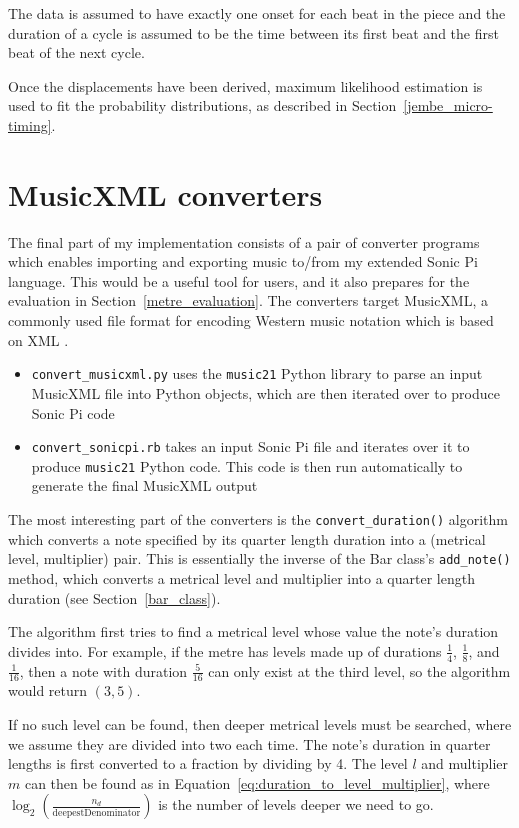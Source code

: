 \documentclass[12pt,twoside,openright]{report}
\begin{document}
The data is assumed to have exactly one onset for each beat in the piece and the
duration of a cycle is assumed to be the time between its first beat and the
first beat of the next cycle.

Once the displacements have been derived, maximum
likelihood estimation is used to fit the probability distributions, as described in
Section~\ref{jembe_micro-timing}.
\newpage



\section{MusicXML converters} \label{musicxml_converters}

The final part of my implementation consists of a pair of converter programs which enables importing and exporting music to/from my extended Sonic Pi language. This would be a useful tool for users, and it also prepares for the evaluation in Section~\ref{metre_evaluation}. The converters target MusicXML, a commonly used file format for encoding Western music notation which is based on XML \cite{good2001}.

\begin{itemize}
	\item \verb'convert_musicxml.py' uses the \verb'music21' Python library to parse an input MusicXML file into Python objects, which are then iterated over to produce Sonic Pi code
	\item \verb'convert_sonicpi.rb' takes an input Sonic Pi file and iterates over it to produce \verb'music21' Python code. This code is then run automatically to generate the final MusicXML output
\end{itemize}

The most interesting part of the converters is the \verb'convert_duration()' algorithm
which converts a note specified by its quarter length duration into a (metrical
level, multiplier) pair. This is essentially the inverse of the Bar class's
\verb'add_note()' method, which converts a metrical level and multiplier into a quarter length duration (see Section~\ref{bar_class}).

The algorithm first tries to find a metrical
level whose value the note's duration divides into. For example, if the metre
has levels made up of durations $\frac{1}{4}$, $\frac{1}{8}$, and $\frac{1}{16}$, then a note with duration $\frac{5}{16}$
can only exist at the third level, so the algorithm would return $(3,5)$.

If no
such level can be found, then deeper metrical levels must be searched, where we
assume they are divided into two each time. The note's duration in quarter
lengths is first converted to a fraction by dividing by 4. The level $l$ and
multiplier $m$ can then be found as in Equation~\ref{eq:duration_to_level_multiplier}, where $\log_2\left(\frac{n_d}{\mathrm{deepestDenominator}}\right)$ is the number of levels deeper we need to
go.
\end{document}
